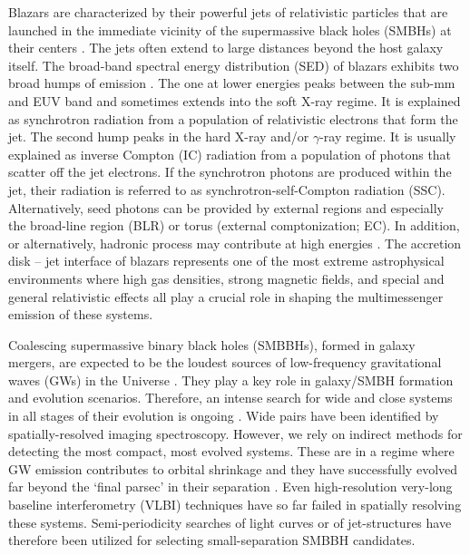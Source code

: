 \documentclass[preprints,article,accept,moreauthors,pdftex]{Definitions/mdpi}
\begin{document}
Blazars are characterized by their powerful jets of relativistic particles that are launched in the immediate vicinity of the supermassive black holes (SMBHs) at their centers \citep{Blandford2019}. The jets often extend to large distances beyond the host galaxy itself.
% 
The broad-band spectral energy distribution (SED) of blazars exhibits two broad humps of emission \citep{Marscher2009, Ghisellini2015}.
The one at lower energies peaks between the sub-mm and EUV band and sometimes extends into the soft X-ray regime. It is explained as synchrotron radiation from a population of relativistic electrons that form the jet. The second hump peaks in the hard X-ray and/or $\gamma$-ray regime. It is usually explained as inverse Compton (IC) radiation from a population of photons that scatter off the jet electrons. If the synchrotron photons are produced within the jet, their radiation is referred to as  synchrotron-self-Compton radiation (SSC). 
Alternatively, seed photons can be provided by external regions and especially the broad-line region (BLR) or torus (external comptonization; EC).
In addition, or alternatively, hadronic process
may contribute at high energies \citep{Boettcher2019}.  
% 
The accretion disk -- jet interface of blazars  represents one of the most extreme astrophysical environments where high gas densities, strong magnetic fields, and special and general relativistic effects all play a crucial role in shaping the multimessenger emission of these systems.  

Coalescing supermassive binary black holes (SMBBHs), formed in galaxy mergers, are expected to be the loudest sources of low-frequency gravitational waves (GWs) in the Universe \citep{Centrella2010}. They play a key role in galaxy/SMBH formation and evolution scenarios. Therefore, an intense search for wide and close systems in all stages of their evolution is ongoing \citep[][]{Komossa2016}. Wide pairs have been identified by spatially-resolved imaging spectroscopy. However, we rely on indirect methods for detecting the most compact, most evolved systems. These are 
in a  regime where GW emission contributes to orbital shrinkage and they have successfully evolved far beyond the 
`final parsec' in their separation \citep{Begelman1980, Merritt2005, ValtonenKarttunen2006}. Even high-resolution very-long baseline interferometry (VLBI) techniques have so far failed in spatially resolving these systems. Semi-periodicity searches of light curves \citep{Sillanpaa1996, Bon2012, Graham2015, Kelley2019} or of jet-structures \citep{Conway1995, Kun2014, Mohan2016} have therefore been utilized for selecting small-separation SMBBH candidates. 
\end{document}
